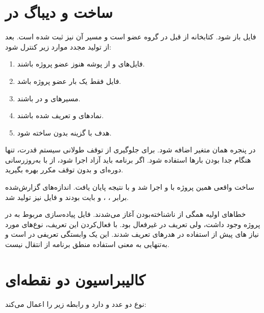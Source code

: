\section{ساخت و دیباگ در }
فایل
باز شود. کتابخانه از قبل در گروه
عضو است و مسیر  آن نیز ثبت شده است. بعد از تولید مجدد  موارد زیر کنترل شود:

\begin{enumerate}
  \item فایل‌های  و  از پوشه  هنوز عضو پروژه باشند.
  \item فایل  فقط یک بار عضو پروژه باشد.
  \item مسیرهای  و  در  باشند.
  \item نمادهای  و  تعریف شده باشند.
  \item هدف با گزینه  بدون  ساخته شود.
\end{enumerate}

در پنجره  همان متغیر
اضافه شود. برای جلوگیری از توقف طولانی سیستم قدرت،  تنها هنگام جدا بودن بارها استفاده شود. اگر برنامه باید آزاد اجرا شود، از  با به‌روزرسانی دوره‌ای و بدون توقف مکرر بهره بگیرید.

ساخت واقعی همین پروژه با  و  اجرا شد و با نتیجه
پایان یافت. اندازه‌های گزارش‌شده برابر
،
،
و
بایت بودند و فایل  نیز تولید شد.

خطاهای اولیه همگی از ناشناخته‌بودن
آغاز می‌شدند. فایل پیاده‌سازی  مربوط به  در پروژه وجود داشت، ولی تعریف
در
غیرفعال بود. با فعال‌کردن این تعریف، نوع‌های مورد نیاز های
پیش از استفاده در هدرهای  تعریف شدند. این یک وابستگی تعریفی در  است و به‌تنهایی به معنی استفاده منطق برنامه از انتقال  نیست.

\section{کالیبراسیون دو نقطه‌ای}
نوع
دو عدد  و  دارد و رابطه زیر را اعمال می‌کند:

